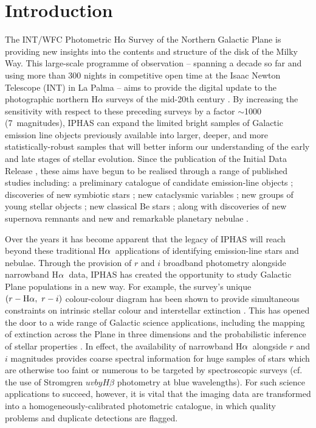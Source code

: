 \documentclass[a4paper,useAMS,usenatbib]{mn2e}
\def\ha{\mbox{H$\rm \alpha$}}
\begin{document}
\section{Introduction}
The INT/WFC Photometric H$\alpha$ Survey
of the Northern Galactic Plane \citep[IPHAS;][]{Drew2005}
is providing new insights into the contents and structure of the disk of the Milky Way.
This large-scale programme of observation
-- spanning a decade so far 
and using more than 300 nights in competitive open time 
at the Isaac Newton Telescope (INT) in La Palma --
aims to provide the digital update 
to the photographic northern H$\alpha$ surveys 
of the mid-20th century \citep[see][]{Kohoutek1999}. 
By increasing the sensitivity 
with respect to these preceding surveys 
by a factor $\sim$1000 (7~magnitudes), 
IPHAS can expand
the limited bright samples of Galactic emission line objects 
previously available into larger, deeper,
and more statistically-robust samples
that will better inform our understanding 
of the early and late stages of stellar evolution.
Since the publication of the Initial Data Release \citep[IDR;][]{Gonzalez-Solares2008},
these aims have begun to be realised through a
range of published studies including: 
a preliminary catalogue of candidate emission-line objects \citep{Witham2008};
discoveries of new symbiotic stars \citep{Corradi2008, Corradi2010, Corradi2011}; 
new cataclysmic variables \citep{Witham2007,Wesson2008,Aungwerojwit2012}; 
new groups of young stellar objects
\citep{Vink2008,Barentsen2011a,Wright2012};
new classical Be stars \citep{Raddi2013};
along with discoveries of new supernova remnants \citep{Sabin2013}
and new and remarkable planetary nebulae 
\citep{Mampaso2006, Viironen2009a, Viironen2009b, Sabin2010, Corradi2011, Viironen2011}.

Over the years it has become apparent that the legacy of IPHAS 
will reach beyond these traditional \ha\ applications 
of identifying emission-line stars and nebulae. 
Through the provision of $r$ and $i$ broadband photometry 
alongside narrowband \ha\ data,
IPHAS has created the opportunity 
to study Galactic Plane populations 
in a new way.
For example, the survey's unique $(r-\ha,\ r-i)$ colour-colour
diagram has been shown to provide simultaneous constraints 
on intrinsic stellar colour and interstellar extinction \citep{Drew2008}. 
This has opened the door 
to a wide range of Galactic science applications, 
including the mapping of extinction across the Plane in three dimensions
and the probabilistic inference of stellar properties
\citep{Sale2009, Sale2010, Giammanco2011, Sale2012, Barentsen2013}. 
In effect, the availability of narrowband \ha\
alongside $r$ and $i$ magnitudes
provides coarse spectral information for huge samples of stars 
which are otherwise too faint or numerous 
to be targeted by spectroscopic surveys (cf. the use of
Stromgren $uvbyH\beta$ photometry at blue wavelengths).
For such science applications to succeed, however, 
it is vital that the imaging data are transformed 
into a homogeneously-calibrated photometric catalogue, 
in which quality problems 
and duplicate detections are flagged. 
\end{document}
